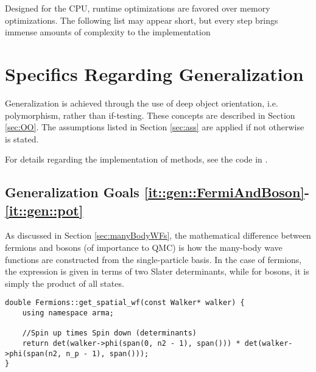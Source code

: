 Designed for the CPU, runtime optimizations are favored over memory optimizations. The following list may appear short, but every step brings immense amounts of complexity to the implementation


\clearpage
\section{Specifics Regarding Generalization}

Generalization is achieved through the use of deep object orientation, i.e. polymorphism, rather than if-testing. These concepts are described in Section \ref{sec:OO}. The assumptions listed in Section \ref{sec:ass} are applied if not otherwise is stated.

For details regarding the implementation of methods, see the code in \cite{libBorealisCode}.

\subsection{Generalization Goals \ref{it::gen::FermiAndBoson}-\ref{it::gen::pot}}

As discussed in Section \ref{sec:manyBodyWFs}, the mathematical difference between fermions and bosons (of importance to QMC) is how the many-body wave functions are constructed from the single-particle basis. In the case of fermions, the expression is given in terms of two Slater determinants, while for bosons, it is simply the product of all states.

\vspace{0.2cm}
\begin{lstlisting}
double Fermions::get_spatial_wf(const Walker* walker) {
    using namespace arma;
    
    //Spin up times Spin down (determinants)
    return det(walker->phi(span(0, n2 - 1), span())) * det(walker->phi(span(n2, n_p - 1), span()));
}
\end{lstlisting}

